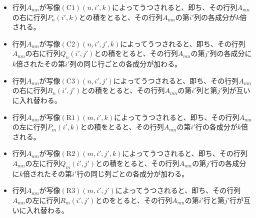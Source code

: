 \documentclass[dvipdfmx]{jsarticle}
\begin{document}
\begin{itemize}
\item
  行列$A_{mn}$が写像$(\mathrm{C1})\left( n,i',k \right)$によってうつされると、即ち、その行列$A_{mn}$の右に行列$P_{n}\left( i',k \right)$との積をとると、その行列$A_{mn}$の第$i'$列の各成分が$k$倍される。
\item
  行列$A_{mn}$が写像$(\mathrm{C2})\left( n,i',j',k \right)$によってうつされると、即ち、その行列$A_{mn}$の右に行列$Q_{n}\left( i',j' \right)$との積をとると、その行列$A_{mn}$の第$j'$列の各成分に$k$倍されたその第$i'$列の同じ行ごとの各成分が加わる。
\item
  行列$A_{mn}$が写像$(\mathrm{C3})\left( n,i',j' \right)$によってうつされると、即ち、その行列$A_{mn}$の右に行列$R_{n}\left( i',j' \right)$との積をとると、その行列$A_{mn}$の第$i'列と第j'$列が互いに入れ替わる。
\item
  行列$A_{mn}$が写像$(\mathrm{R1})\left( m,i',k \right)$によってうつされると、即ち、その行列$A_{mn}$の左に行列$P_{m}\left( i',k \right)$との積をとると、その行列$A_{mn}$の第$i'$行の各成分が$k$倍される。
\item
  行列$A_{mn}$が写像$(\mathrm{R2})\left( m,i',j',k \right)$によってうつされると、即ち、その行列$A_{mn}$の左に行列$Q_{m}\left( i',j' \right)$との積をとると、その行列$A_{mn}$の第$j'$行の各成分に$k$倍されたその第$i'$行の同じ列ごとの各成分が加わる。
\item
  行列$A_{mn}$が写像$(\mathrm{R3})\left( m,i',j' \right)$によってうつされると、即ち、その行列$A_{mn}$の左に行列$R_{m}\left( i',j' \right)$とのをとると、その行列$A_{mn}$の第$i'行と第j'$行が互いに入れ替わる。
\end{itemize}
\end{document}
